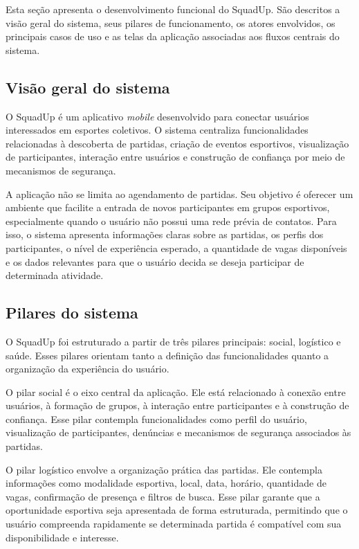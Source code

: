 \documentclass[a4paper, 12pt]{article}
\begin{document}
\begin{justify}
Esta seção apresenta o desenvolvimento funcional do SquadUp. São descritos a visão geral do sistema, seus pilares de funcionamento, os atores envolvidos, os principais casos de uso e as telas da aplicação associadas aos fluxos centrais do sistema.

\subsection{Visão geral do sistema}

O SquadUp é um aplicativo \textit{mobile} desenvolvido para conectar usuários interessados em esportes coletivos. O sistema centraliza funcionalidades relacionadas à descoberta de partidas, criação de eventos esportivos, visualização de participantes, interação entre usuários e construção de confiança por meio de mecanismos de segurança.

A aplicação não se limita ao agendamento de partidas. Seu objetivo é oferecer um ambiente que facilite a entrada de novos participantes em grupos esportivos, especialmente quando o usuário não possui uma rede prévia de contatos. Para isso, o sistema apresenta informações claras sobre as partidas, os perfis dos participantes, o nível de experiência esperado, a quantidade de vagas disponíveis e os dados relevantes para que o usuário decida se deseja participar de determinada atividade.

\subsection{Pilares do sistema}

O SquadUp foi estruturado a partir de três pilares principais: social, logístico e saúde. Esses pilares orientam tanto a definição das funcionalidades quanto a organização da experiência do usuário.

O pilar social é o eixo central da aplicação. Ele está relacionado à conexão entre usuários, à formação de grupos, à interação entre participantes e à construção de confiança. Esse pilar contempla funcionalidades como perfil do usuário, visualização de participantes, denúncias e mecanismos de segurança associados às partidas.

O pilar logístico envolve a organização prática das partidas. Ele contempla informações como modalidade esportiva, local, data, horário, quantidade de vagas, confirmação de presença e filtros de busca. Esse pilar garante que a oportunidade esportiva seja apresentada de forma estruturada, permitindo que o usuário compreenda rapidamente se determinada partida é compatível com sua disponibilidade e interesse.


\end{justify}
\end{document}
